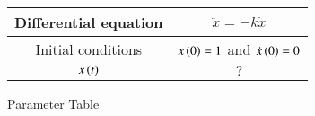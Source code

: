 \centering
\begin{tabular}{ | c | c|  } 
  \hline
   Differential equation & $\ddot{x} = -k\dot{x}$ \\ 
  \hline
  Initial conditions & $x\left(0\right)=1$ and $\dot{x}\left(0\right)=0$ \\
  \hline
  $x\left(t\right)$ & $?$ \\ 
  \hline
 
\end{tabular}
\caption{Parameter Table}
\label{tab:gate2023.in.20.1}
